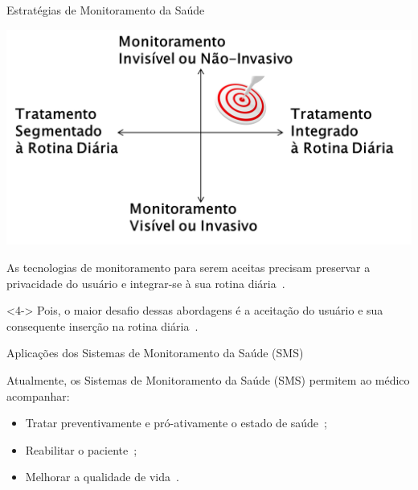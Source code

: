 \documentclass{beamer}
\begin{document}
\begin{frame}{Estratégias de Monitoramento da Saúde}
  \begin{block}{}
      \center \includegraphics[height=1.8 in]{img/estrategmonitorament.png}
  \end{block}
  \begin{block}{}
As tecnologias de monitoramento para serem aceitas precisam preservar a privacidade do usuário e integrar-se à sua rotina diária~\cite{aarh10}.
  \end{block}
  
   \begin{alertblock}{}<4->
   Pois, o maior desafio dessas abordagens é a aceitação do usuário e sua consequente inserção na rotina diária~\cite{alemdar2015}.
  \end{alertblock}

\end{frame}


\begin{frame}{Aplicações dos Sistemas de Monitoramento da Saúde (SMS)}  
  \begin{block}{}
  Atualmente, os Sistemas de Monitoramento da Saúde (SMS) permitem ao médico acompanhar:  
  \begin{itemize}[<+->]
   \item Tratar preventivamente e pró-ativamente o estado de saúde~\cite{bardram2010}; 
   \item Reabilitar o paciente~\cite{sacbespoke2014};
   \item Melhorar a qualidade de vida~\cite{sacsvmhms2014}. 
  \end{itemize} 
  \end{block} 
\end{frame}
\end{document}
